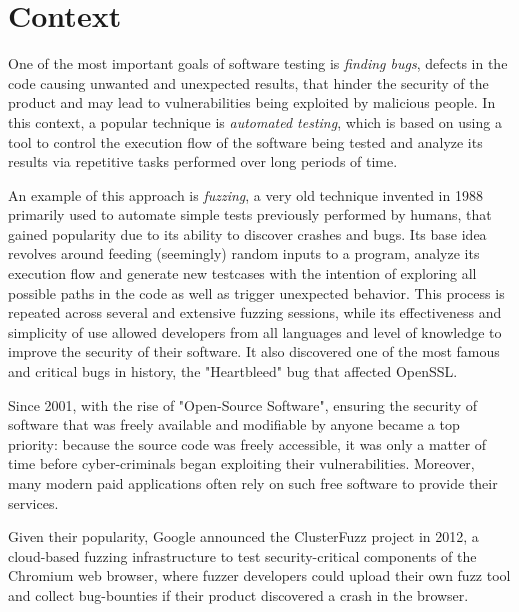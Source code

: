 \section{Context}
One of the most important goals of software testing is \textit{finding bugs}, defects in the code causing unwanted and unexpected results, that hinder the security of the product and may lead to vulnerabilities being exploited by malicious people. In this context, a popular technique is \textit{automated testing}, which is based on using a tool to control the execution flow of the software being tested and analyze its results via repetitive tasks performed over long periods of time. 

An example of this approach is \textit{fuzzing}, a very old technique invented in 1988 primarily used to automate simple tests previously performed by humans, that gained popularity due to its ability to discover crashes and bugs. Its base idea revolves around feeding (seemingly) random inputs to a program, analyze its execution flow and generate new testcases with the intention of exploring all possible paths in the code as well as trigger unexpected behavior. This process is repeated across several and extensive fuzzing sessions, while its effectiveness and simplicity of use allowed developers from all languages and level of knowledge to improve the security of their software. It also discovered one of the most famous and critical bugs in history, the "Heartbleed" bug that affected OpenSSL.

Since 2001, with the rise of "Open-Source Software", ensuring the security of software that was freely available and modifiable by anyone became a top priority: because the source code was freely accessible, it was only a matter of time before cyber-criminals began exploiting their vulnerabilities. Moreover, many modern paid applications often rely on such free software to provide their services. 


Given their popularity, Google announced the ClusterFuzz project in 2012, a cloud-based fuzzing infrastructure to test security-critical components of the Chromium web browser, where fuzzer developers could upload their own fuzz tool and collect bug-bounties if their product discovered a crash in the browser.

